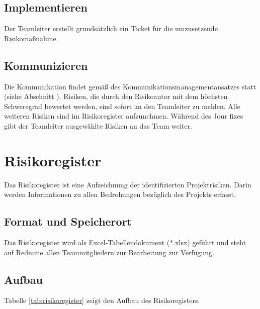 \documentclass[a4paper,11pt,listof=numbered,glossary=totoc,parskip=half,toc=bib]{scrreprt}
\begin{document}
\subsection{Implementieren}

Der Teamleiter erstellt grundsätzlich ein Ticket für die umzusetzende Risikomaßnahme.

\subsection{Kommunizieren}

Die Kommunikation findet gemäß des Kommunikationsmanagementansatzes statt (siehe Abschnitt ). Risiken, die durch den Risikoautor mit dem höchsten Schweregrad bewertet werden, sind sofort an den Teamleiter zu melden. Alle weiteren Risiken sind im Risikoregister aufzunehmen. Während des Jour fixes gibt der Teamleiter ausgewählte Risiken an das Team weiter.

\section{Risikoregister}
\label{subsec:risikoregister}

Das Risikoregister ist eine Aufzeichnung der identifizierten Projektrisiken. Darin werden Informationen zu allen Bedrohungen bezüglich des Projekts erfasst.

\subsection{Format und Speicherort}

Das Risikoregister wird als Excel-Tabellendokument (*.xlsx) geführt und steht auf Redmine allen Teammitgliedern zur Bearbeitung zur Verfügung.

\subsection{Aufbau}


Tabelle \ref{tab:risikoregister} zeigt den Aufbau des Risikoregisters.
\end{document}
